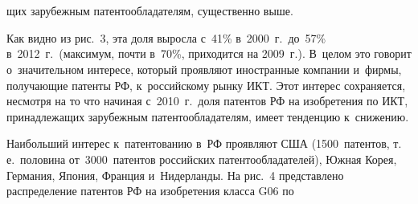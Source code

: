 \pagebreak

\begin{figure} %
      \vspace*{1pt}
 \begin{center}
 \mbox{%
 \epsfxsize=114.91mm
 }
 \end{center}
 \vspace*{-9pt}
 \vspace*{16pt}
 \begin{center}
 \mbox{%
 \epsfxsize=113.489mm
 }
 \end{center}
 \vspace*{-9pt}
\vspace*{14pt}
     \end{figure}


     

\begin{multicols}{2}

\noindent 
щих зарубежным 
патентообладателям, существенно выше. 

Как видно из рис.~3, эта доля выросла 
с~41\% в~2000~г.\ до~57\% в~2012~г.\ (максимум, почти в~70\%, приходится на 
2009~г.). В~целом это говорит о~значительном интересе, который проявляют 
иностранные компании и~фирмы, получающие патенты РФ, к~российскому рынку 
ИКТ. Этот интерес сохраняется, несмотря на то что начиная с~2010~г.\ доля 
патентов РФ на изобретения по ИКТ, принадлежащих зарубежным 
патентообладателям, имеет тенденцию к~снижению.


  
  Наибольший интерес к~патентованию в~РФ проявляют США (1500~патентов, 
т.\,е.\ половина от~3000~патентов российских патентообладателей), Южная 
Корея, Германия, Япония, Франция и~Нидерланды. 
%
На рис.~4 пред\-став\-ле\-но 
распределение патентов РФ на изобретения класса G06 по\linebreak

\end{multicols}

